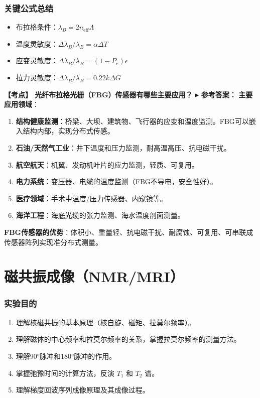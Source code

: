 \documentclass[12pt,a4paper]{article}
\newcommand{\exam}[1]{\textbf{\color{blue!70!black}【考点】#1}}
\newcommand{\answer}[1]{\vspace{2pt}\noindent\textbf{\color{teal!80!black}▸ 参考答案：}#1\vspace{4pt}}
\newcommand{\qa}[2]{\exam{#1}\answer{#2}}
\begin{document}
\section{关键公式总结}
\begin{itemize}
    \item 布拉格条件：\(\lambda_B = 2n_{\text{eff}}\Lambda\)
    \item 温度灵敏度：\(\Delta \lambda_B/\lambda_B = \alpha \Delta T\)
    \item 应变灵敏度：\(\Delta \lambda_B/\lambda_B = (1-P_e)\epsilon\)
    \item 拉力灵敏度：\(\Delta \lambda_B/\lambda_B = 0.22 k \Delta G\)
\end{itemize}

\qa{
    光纤布拉格光栅（FBG）传感器有哪些主要应用？
}{
    \textbf{主要应用领域}：
    \begin{enumerate}
        \item \textbf{结构健康监测}：桥梁、大坝、建筑物、飞行器的应变和温度监测。FBG可以嵌入结构内部，实现分布式传感。
        \item \textbf{石油/天然气工业}：井下温度和压力监测，耐高温高压、抗电磁干扰。
        \item \textbf{航空航天}：机翼、发动机叶片的应力监测，轻质、可复用。
        \item \textbf{电力系统}：变压器、电缆的温度监测（FBG不导电，安全性好）。
        \item \textbf{医疗领域}：手术中温度/压力传感器、内窥镜等。
        \item \textbf{海洋工程}：海底光缆的张力监测、海水温度剖面测量。
    \end{enumerate}
    \textbf{FBG传感器的优势}：体积小、重量轻、抗电磁干扰、耐腐蚀、可复用、可串联成传感器阵列实现准分布式测量。
}

\newpage

\part{磁共振成像（NMR/MRI）}

\section{实验目的}
\begin{enumerate}
    \item 理解核磁共振的基本原理（核自旋、磁矩、拉莫尔频率）。
    \item 理解磁体的中心频率和拉莫尔频率的关系，掌握拉莫尔频率的测量方法。
    \item 理解90°脉冲和180°脉冲的作用。
    \item 掌握弛豫时间的计算方法，反演 \(T_1\) 和 \(T_2\) 谱。
    \item 理解梯度回波序列成像原理及其成像过程。
\end{enumerate}
\end{document}
